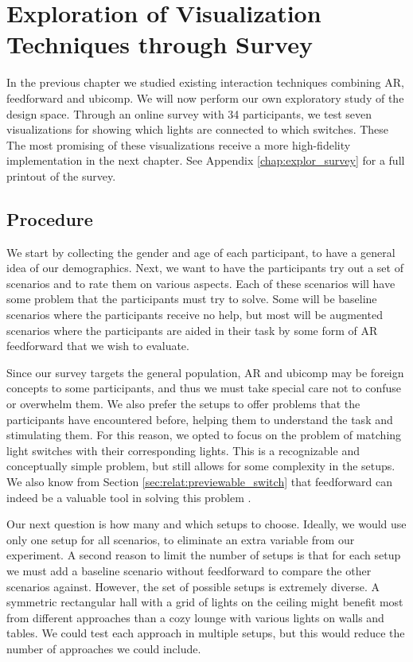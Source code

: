 \chapter{Exploration of Visualization Techniques through Survey} \label{chap:explor}
In the previous chapter we studied existing interaction techniques combining AR, feedforward and ubicomp. We will now perform our own exploratory study of the design space. Through an online survey with 34 participants, we test seven visualizations for showing which lights are connected to which switches. These  The most promising of these visualizations receive a more high-fidelity implementation in the next chapter. See Appendix \ref{chap:explor_survey} for a full printout of the survey.

\section{Procedure} \label{sec:explor:procedure}
We start by collecting the gender and age of each participant, to have a general idea of our demographics. Next, we want to have the participants try out a set of scenarios and to rate them on various aspects. Each of these scenarios will have some problem that the participants must try to solve. Some will be baseline scenarios where the participants receive no help, but most will be augmented scenarios where the participants are aided in their task by some form of AR feedforward that we wish to evaluate.

Since our survey targets the general population, AR and ubicomp may be foreign concepts to some participants, and thus we must take special care not to confuse or overwhelm them. We also prefer the setups to offer problems that the participants have encountered before, helping them to understand the task and stimulating them. For this reason, we opted to focus on the problem of matching light switches with their corresponding lights. This is a recognizable and conceptually simple problem, but still allows for some complexity in the setups. We also know from Section \ref{sec:relat:previewable_switch} that feedforward can indeed be a valuable tool in solving this problem \cite{park2014previewable}.

Our next question is how many and which setups to choose. Ideally, we would use only one setup for all scenarios, to eliminate an extra variable from our experiment. A second reason to limit the number of setups is that for each setup we must add a baseline scenario without feedforward to compare the other scenarios against. However, the set of possible setups is extremely diverse. A symmetric rectangular hall with a grid of lights on the ceiling might benefit most from different approaches than a cozy lounge with various lights on walls and tables. We could test each approach in multiple setups, but this would reduce the number of approaches we could include.

